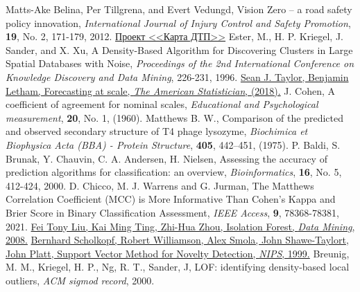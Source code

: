 \begin{thebibliography}{99}
	Matts-Ake Belina, Per Tillgrena, and Evert Vedungd, Vision Zero – a road safety policy innovation,
	\textit{International Journal of Injury Control and Safety Promotion}, \textbf{19}, No. 2, 171-179, 2012. 
	\href{https://dtp-stat.ru}
	{Проект <<Карта ДТП>>}
	Ester, M., H. P. Kriegel, J. Sander, and X. Xu, A Density-Based Algorithm for Discovering Clusters in Large Spatial Databases with Noise,
	\textit{Proceedings of the 2nd International Conference on Knowledge Discovery and Data Mining}, 226-231, 1996.
	\href{https://peerj.com/preprints/3190.pdf}{Sean J. Taylor, Benjamin Letham, Forecasting at scale, \textit{The American Statistician}, (2018).}
	J. Cohen, A coefficient of agreement for nominal scales, \textit{Educational and Psychological measurement}, \textbf{20}, No. 1, (1960).
	Matthews B. W., Comparison of the predicted and observed secondary structure of T4 phage lysozyme,
	\textit{Biochimica et Biophysica Acta (BBA) - Protein Structure}, \textbf{405}, 442–451, (1975).
	P. Baldi, S. Brunak, Y. Chauvin, C. A. Andersen, H. Nielsen, Assessing the accuracy of prediction algorithms for classification:
	an overview, \textit{Bioinformatics}, \textbf{16}, No. 5, 412-424, 2000.
	D. Chicco, M. J. Warrens and G. Jurman, 
	The Matthews Correlation Coefficient (MCC) is More Informative Than Cohen’s Kappa and Brier Score in Binary Classification Assessment,
	\textit{IEEE Access}, \textbf{9}, 78368-78381, 2021.
	\href{https://cs.nju.edu.cn/zhouzh/zhouzh.files/publication/icdm08b.pdf}
	{Fei Tony Liu, Kai Ming Ting, Zhi-Hua Zhou, Isolation Forest, \textit{Data Mining}, 2008.}
	\href{https://papers.nips.cc/paper/1999/file/8725fb777f25776ffa9076e44fcfd776-Paper.pdf}
	{Bernhard Scholkopf, Robert Williamson, Alex Smola, John Shawe-Taylort, John Platt, Support Vector Method for Novelty Detection,
	\textit{NIPS}, 1999.}
	Breunig, M. M., Kriegel, H. P., Ng, R. T., Sander, J, LOF: identifying density-based local outliers, \textit{ACM sigmod record}, 2000.
\end{thebibliography}
